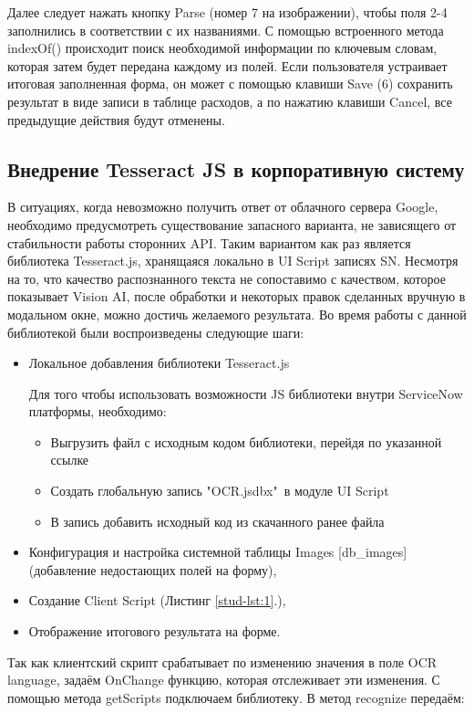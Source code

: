 \documentclass[14pt]{mmcs_article}
\begin{document}
Далее следует нажать кнопку Parse (номер 7 на изображении), чтобы поля 2-4 заполнились в соответствии с их названиями. С помощью встроенного метода indexOf() происходит поиск необходимой информации по ключевым словам, которая затем будет передана каждому из полей. Если пользователя устраивает итоговая заполненная форма, он может с помощью клавиши Save (6) сохранить результат в виде записи в таблице расходов, а по нажатию клавиши Cancel, все предыдущие действия будут отменены.

\subsection{Внедрение Tesseract JS в корпоративную систему}
В ситуациях, когда невозможно получить ответ от облачного сервера Google, необходимо предусмотреть существование запасного варианта, не зависящего от стабильности работы сторонних API. Таким вариантом как раз является библиотека Tesseract.js, хранящаяся локально в UI Script записях SN. Несмотря на то, что качество распознанного текста не сопоставимо с качеством, которое показывает Vision AI, после обработки и некоторых правок сделанных вручную в модальном окне, можно достичь желаемого результата.
Во время работы с данной библиотекой были воспроизведены следующие шаги:
\begin{itemize}
\item Локальное добавления библиотеки Tesseract.js

Для того чтобы использовать возможности JS библиотеки внутри ServiceNow платформы, необходимо:
    \begin{itemize}
    \item Выгрузить файл с исходным кодом библиотеки, перейдя по указанной ссылке \cite{stud:b01}
    \item Создать глобальную запись "OCR.jsdbx"\ в модуле UI Script
    \item В запись добавить исходный код из скачанного ранее файла
    \end{itemize}
\item Конфигурация и настройка системной таблицы Images [db\_images] (добавление недостающих полей на форму),
\item Создание Client Script (Листинг \ref{stud-lst:1}.),
\item Отображение итогового результата на форме.
\end{itemize}
Так как клиентский скрипт  срабатывает по изменению значения в поле OCR language, задаём OnChange функцию, которая отслеживает эти изменения. С помощью метода getScripts подключаем библиотеку. В метод recognize передаём:
\end{document}
